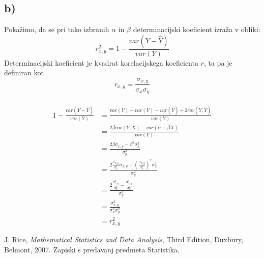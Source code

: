 \documentclass[A4paper, 11pt]{article}
\begin{document}
\subsection*{b)}
Pokažimo, da se pri tako izbranih $\alpha$ in $\beta$ determinacijski koeficient izraža v obliki:
\[ r_{x,y}^2 = 1 - \frac{var(Y - \hat{Y})}{var(Y)} \]
Determinacijski koeficient je kvadrat korelacijskega koeficienta $r$, ta pa je definiran kot
\[ r_{x,y} = \frac{\sigma_{x,y}}{\sigma_x \sigma_y} \]
\\
\[
\begin{split}
1 - \frac{var(Y - \hat{Y})}{var(Y)} & = \frac{var(Y) - var(Y) - var(\hat{Y}) + 2cov(Y,\hat{Y})}{var(Y)} \\
                                                        & = \frac{2 \beta cov(Y,X) - var(\alpha + \beta X)}{var(Y)} \\
                                                        & = \frac{2 \beta \sigma_{x,y} - \beta^2 \sigma_x^2}{\sigma_y^2} \\
                                                        & = \frac{2 \frac{\sigma_{x,y}}{\sigma_x^2} \sigma_{x,y} - ( \frac{\sigma_{x,y}}{\sigma_x^2} )^2  \sigma_x^2}{\sigma_y^2} \\
                                                        & = \frac{2 \frac{\sigma_{x,y}^2}{\sigma_x^2} -  \frac{\sigma_{x,y}^2}{\sigma_x^2}}{\sigma_y^2} \\
                                                        & = \frac{\sigma_{x,y}^2}{\sigma_x^2 \sigma_y^2} \\
                                                        & = r_{x,y}^2
\end{split}
\]


\begin{thebibliography}{9}
	J. Rice, \emph{Mathematical Statistics and Data Analysis}, Third Edition, Duxbury, Belmont, 2007.
	Zapiski s predavanj predmeta Statistika.
\end{thebibliography}
\end{document}
